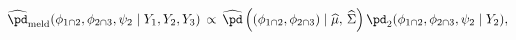 \begin{equation}
\begin{gathered}
  \widehat{\pd}_{\text{meld}} (\phi_{1 \cap 2}, \phi_{2 \cap 3}, \psi_{2} \mid Y_{1}, Y_{2}, Y_{3})
  \, \propto \,
  \widehat{\pd}\left((\phi_{1 \cap 2}, \phi_{2 \cap 3}) \mid \widehat{\mu}, \, \widehat{\Sigma}\right)
  \pd_{2}(\phi_{1 \cap 2}, \phi_{2 \cap 3}, \psi_{2} \mid Y_{2}),
\end{gathered}
\label{eqn:final-normal-approx}
\end{equation}